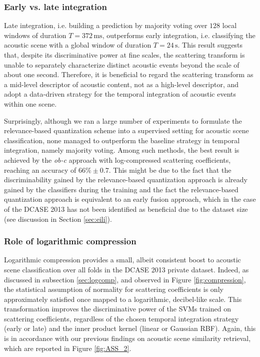 \documentclass[journal]{IEEEtran}
\makeatletter
\newcommand*{\ie}{i.e.\@\xspace}
\newcommand*{\vs}{vs.\@\xspace}
\makeatother
\begin{document}
\subsubsection*{Early \vs late integration}
Late integration, \ie building a prediction by majority voting over $128$ local windows of duration $T=372\,\mathrm{ms}$, outperforms early integration, \ie classifying the acoustic scene with a global window of duration $T=24\,\mathrm{s}$.
This result suggests that, despite its discriminative power at fine scales, the scattering transform is unable to separately characterize distinct acoustic events beyond the scale of about one second.
Therefore, it is beneficial to regard the scattering transform as a mid-level descriptor of acoustic content, not as a high-level descriptor, and adopt a data-driven strategy for the temporal integration of acoustic events within one scene.

Surprisingly, although we ran a large number of experiments to formulate the relevance-based quantization scheme into a supervised setting for acoustic scene classification, none managed to outperform the baseline strategy in temporal integration, namely majority voting. Among such methods, the best result is achieved by the \emph{ob-c} approach with log-compressed scattering coefficients, reaching an accuracy of $66\% \pm0.7$. This might be due to the fact that the discriminability gained by the relevance-based quantization approach is already gained by the classifiers during the training and the fact the relevance-based quantization approach is equivalent to an early fusion approach, which in the case of the DCASE 2013 has not been identified as beneficial due to the dataset size (see discussion in Section \ref{sec:eili}).

\subsubsection*{Role of logarithmic compression}

Logarithmic compression provides a small, albeit consistent boost to acoustic scene classification over all folds in the DCASE 2013 private dataset.
Indeed, as discussed in subsection \ref{sec:logcomp}, and observed in Figure \ref{fig:compression}, the statistical assumption of normality for scattering coefficients is only approximately satisfied once mapped to a logarithmic, decibel-like scale.
This transformation improves the discriminative power of the SVMs trained on scattering coefficients, regardless of the chosen temporal integration strategy (early or late) and the inner product kernel (linear or Gaussian RBF).
Again, this is in accordance with our previous findings on acoustic scene similarity retrieval, which are reported in Figure \ref{fig:ASS_2}.
\end{document}
